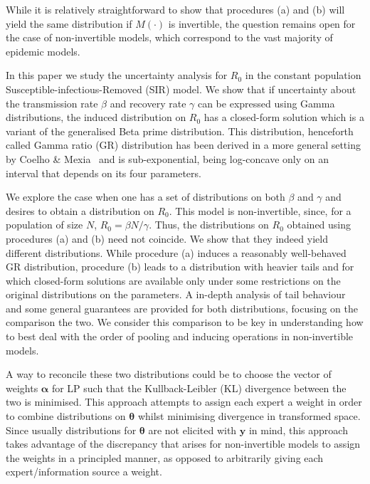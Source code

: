 \documentclass[11pt]{article}
\begin{document}
While it is relatively straightforward to show that procedures (a) and (b) will yield the same distribution if $M(\cdot)$ is invertible, the question remains open for the case of non-invertible models, which correspond to the vast majority of epidemic models.

In this paper we study the uncertainty analysis for $R_0$ in the constant population 	Susceptible-infectious-Removed (SIR) model.
We show that if uncertainty about the transmission rate $\beta$ and recovery rate $\gamma$ can be expressed using Gamma distributions, the induced distribution on $R_0$ has a closed-form solution which is a variant of the generalised Beta prime distribution.
This distribution, henceforth called Gamma ratio (GR) distribution has been derived in a more general setting by Coelho \& Mexia~\cite{Coelho2007} and is sub-exponential, being log-concave only on an interval that depends on its four parameters.%

We explore the case when one has a set of distributions on both $\beta$ and $\gamma$ and desires to obtain a distribution on $R_0$.
This model is non-invertible, since, for a population of size $N$,  $R_0 = \beta N/\gamma$.
Thus, the distributions on $R_0$ obtained using procedures (a) and (b) need not coincide. %
We show that they indeed yield different distributions.
While procedure (a) induces a reasonably well-behaved GR distribution, procedure (b) leads to a distribution with heavier tails and for which closed-form solutions are available only under some restrictions on the original distributions on the parameters.
A in-depth analysis of tail behaviour and some general guarantees are provided for both distributions, focusing on the comparison the two.
We consider this comparison to be key in understanding how to best deal with the order of pooling and inducing operations in non-invertible models.

A way to reconcile these two distributions could be to choose the vector of weights $\boldsymbol\alpha$ for LP such that the Kullback-Leibler (KL) divergence between the two is minimised.
This approach attempts to assign each expert a weight in order to combine distributions on $\boldsymbol\theta$ whilst minimising divergence in transformed space.
Since usually distributions for $\boldsymbol\theta$ are not elicited with $\mathbf{y}$ in mind, this approach takes advantage of the discrepancy that arises for non-invertible models to assign the weights in a principled manner, as opposed to arbitrarily giving each expert/information source a weight.
\end{document}
